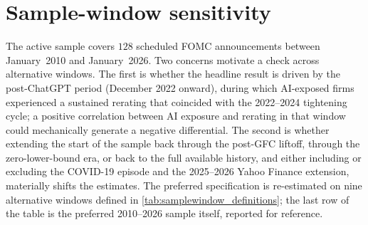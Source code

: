 \section{Sample-window sensitivity}
\label{sec:rob-samplewindows}

The active sample covers $128$ scheduled FOMC announcements between
January~2010 and January~2026. Two concerns motivate a check across
alternative windows. The first is whether the headline result is
driven by the post-ChatGPT period (December 2022 onward), during
which AI-exposed firms experienced a sustained rerating that
coincided with the 2022--2024 tightening cycle; a positive
correlation between AI exposure and rerating in that window could
mechanically generate a negative differential. The second is whether
extending the start of the sample back through the post-GFC liftoff,
through the zero-lower-bound era, or back to the full available
history, and either including or excluding the COVID-19 episode and
the 2025--2026 Yahoo Finance extension, materially shifts the
estimates. The preferred specification is re-estimated on nine
alternative windows defined in
\cref{tab:samplewindow_definitions}; the last row of the table is
the preferred 2010--2026 sample itself, reported for reference.

\begin{table}[htbp]
\centering\small
\caption[Sample-window definitions]{Sample-window definitions}
\label{tab:samplewindow_definitions}

\end{table}

\begin{table}[htbp]
\centering\small
\caption[Sample-window sensitivity: High AI--No AI key-horizon
estimates]{Sample-window sensitivity: High AI--No AI key-horizon
estimates}
\label{tab:samplewindow_key}

\end{table}

